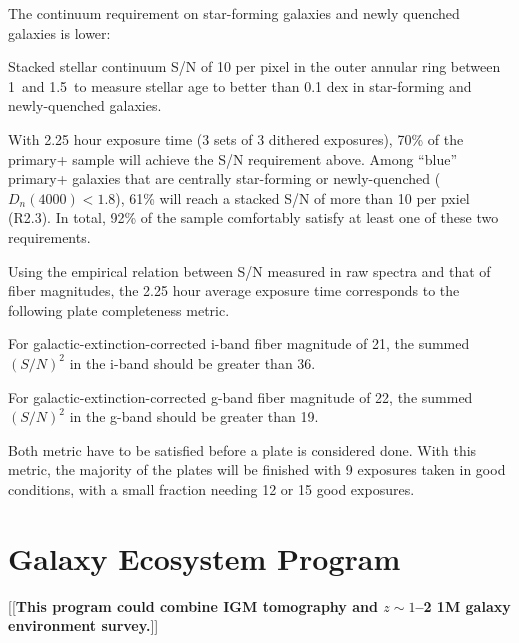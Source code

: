 \documentclass[11pt,a4paper,twoside,onecolumn,openany,final,oldfontcommands]{memoir}
\newcommand{\edit}[2][todo]{{\color{#1}[[{\bf #2}]]}}
\begin{document}
\noindent The continuum requirement on star-forming galaxies and newly quenched galaxies is lower: 

\begin{requirement}

\reqitem Stacked stellar continuum S/N of 10 per pixel in the outer annular ring between 1\Reff\ and 1.5\Reff\ to measure stellar age to better than 0.1 dex in star-forming and newly-quenched galaxies. 

\end{requirement}

With 2.25 hour exposure time (3 sets of 3 dithered exposures), 70\% of the primary+ sample will achieve the S/N requirement above. Among ``blue'' primary+ galaxies that are centrally star-forming or newly-quenched ($D_n(4000) < 1.8$), 61\% will reach a stacked S/N of more than 10 per pxiel (R2.3).  In total, 92\% of the sample comfortably satisfy at least one of these two requirements.

Using the empirical relation between S/N measured in raw spectra and that of fiber magnitudes, the 2.25 hour average exposure time corresponds to the following plate completeness metric. 


\begin{requirement}

\reqitem For galactic-extinction-corrected i-band fiber magnitude of 21, the summed $(S/N)^2$ in the i-band should be greater than 36.
    
\reqitem For galactic-extinction-corrected g-band fiber magnitude of 22, the summed $(S/N)^2$ in the g-band should be greater than 19.

\end{requirement}

Both metric have to be satisfied before a plate is considered done. With this metric, the majority of the plates will be finished with 9 exposures taken in good conditions, with a small fraction needing 12 or 15 good exposures. 


\section{Galaxy Ecosystem Program}\label{prog:ecosystem}

\edit{This program could combine IGM tomography and $z \sim 1$--2 1M galaxy environment survey.}
\end{document}
